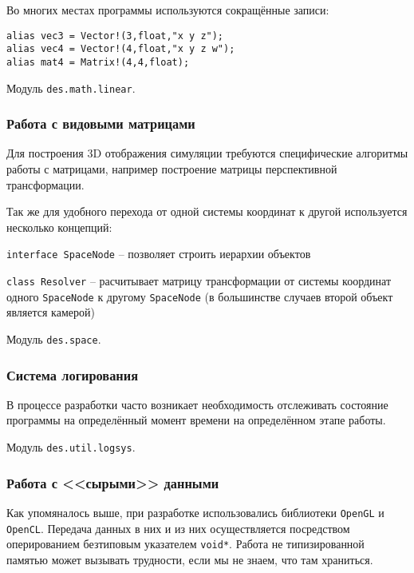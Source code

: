 Во многих местах программы используются сокращённые записи:
\begin{verbatim}
alias vec3 = Vector!(3,float,"x y z");
alias vec4 = Vector!(4,float,"x y z w");
alias mat4 = Matrix!(4,4,float);
\end{verbatim}

Модуль \verb|des.math.linear|.

\subsubsection{Работа с видовыми матрицами}

Для построения 3D отображения симуляции требуются специфические алгоритмы работы
с матрицами, например построение матрицы перспективной трансформации.

Так же для удобного перехода от одной системы координат к другой используется 
несколько концепций:

\begin{mintemize}
\item \verb|interface SpaceNode| -- позволяет строить иерархии объектов
\item \verb|class Resolver| -- расчитывает матрицу трансформации от системы координат
    одного \verb|SpaceNode| к другому \verb|SpaceNode| (в большинстве случаев второй объект
    является камерой)
\end{mintemize}

Модуль \verb|des.space|.

\subsubsection{Система логирования}

В процессе разработки часто возникает необходимость отслеживать состояние
программы на определённый момент времени на определённом этапе работы.

Модуль \verb|des.util.logsys|.

\subsubsection{Работа с <<сырыми>> данными}

Как упомяналось выше, при разработке использовались библиотеки \verb|OpenGL| и 
\verb|OpenCL|. Передача данных в них и из них осуществляется посредством
оперированием безтиповым указателем \verb|void*|. Работа не типизированной
памятью может вызывать трудности, если мы не знаем, что там храниться.

